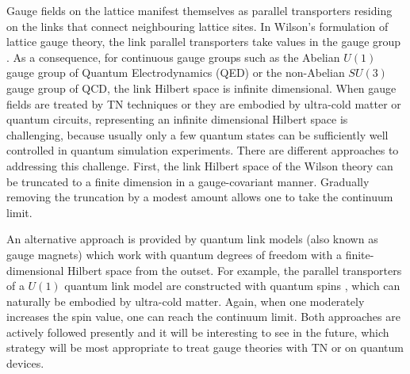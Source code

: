 \documentclass[epj,final]{svjour}
\begin{document}
Gauge fields on the lattice manifest themselves as parallel transporters residing on the links that connect neighbouring lattice sites. In Wilson's formulation of lattice gauge theory, the link parallel transporters take values in the gauge group \cite{Wilson:1974sk}. As a consequence, for continuous gauge groups such as the Abelian $U(1)$ gauge group of Quantum Electrodynamics (QED) or the non-Abelian $SU(3)$ gauge group of QCD, the link Hilbert space is infinite dimensional. When gauge fields are treated by TN techniques or they are embodied by ultra-cold matter or quantum circuits, representing an infinite dimensional Hilbert space is challenging, because usually only a few quantum states can be sufficiently well controlled in quantum simulation experiments. There are different approaches to addressing this challenge. First, the link Hilbert space of the Wilson theory can be truncated to a finite dimension in a gauge-covariant manner. Gradually removing the truncation by a modest amount allows one to take the continuum limit.

An alternative approach is provided by quantum link models (also known as gauge magnets)\cite{horn_finite_1981,Orland1990,Chandrasekharan:1996ih} which work with quantum degrees of freedom with a finite-dimen\-sional Hilbert space from the outset. For example, the parallel transporters of a $U(1)$ quantum link model are constructed with quantum spins \cite{Banerjee2013QuantumLinkDeconfined}, which can naturally be embodied by ultra-cold matter. Again, when one moderately increases the spin value, one can reach the continuum limit. Both approaches are actively followed presently and it will be interesting to see in the future, which strategy will be most appropriate to treat gauge theories with TN or on quantum devices. 
\end{document}
